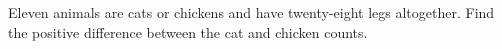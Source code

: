 Eleven animals are cats or chickens and have twenty-eight legs altogether. Find the positive difference between the cat and chicken counts.
